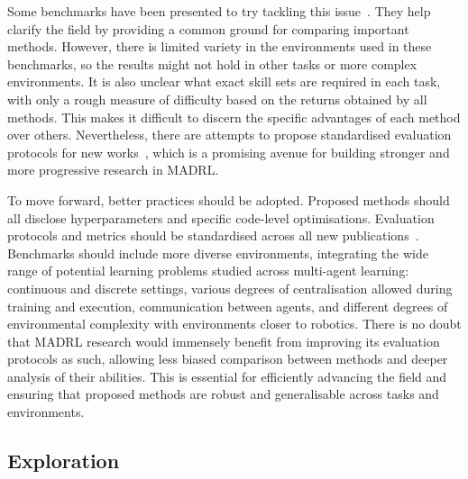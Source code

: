 Some benchmarks have been presented to try tackling this issue~\citep{Yu2021_Benchmark, Papoudakis2020_BenchmarkMADRL, Ellis2023_SMACv2, Bettini2023_BenchMARL}. They help clarify the field by providing a common ground for comparing important methods. However, there is limited variety in the environments used in these benchmarks, so the results might not hold in other tasks or more complex environments. It is also unclear what exact skill sets are required in each task, with only a rough measure of difficulty based on the returns obtained by all methods. This makes it difficult to discern the specific advantages of each method over others. Nevertheless, there are attempts to propose standardised evaluation protocols for new works~\citep{Gorsane2022_BenchmarkCoopMARL, Singh2023_EvalMARL}, which is a promising avenue for building stronger and more progressive research in MADRL. 

To move forward, better practices should be adopted. Proposed methods should all disclose hyperparameters and specific code-level optimisations. Evaluation protocols and metrics should be standardised across all new publications~\citep{Gorsane2022_BenchmarkCoopMARL}. Benchmarks should include more diverse environments, integrating the wide range of potential learning problems studied across multi-agent learning: continuous and discrete settings, various degrees of centralisation allowed during training and execution, communication between agents, and different degrees of environmental complexity with environments closer to robotics. There is no doubt that MADRL research would immensely benefit from improving its evaluation protocols as such, allowing less biased comparison between methods and deeper analysis of their abilities. This is essential for efficiently advancing the field and ensuring that proposed methods are robust and generalisable across tasks and environments. 





\subsection{Exploration}

